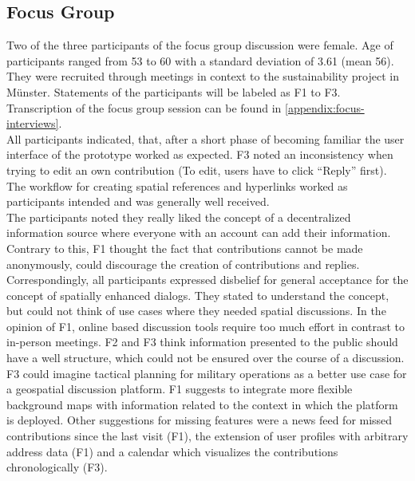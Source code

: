 \subsection{Focus Group}
\label{sub:ev_focus}
Two of the three participants of the focus group discussion were female. Age of participants ranged from 53 to 60 with a standard deviation of 3.61 (mean 56). They were recruited through meetings in context to the sustainability project in Münster. Statements of the participants will be labeled as F1 to F3. Transcription of the focus group session can be found in \ref{appendix:focus-interviews}.\\
All participants indicated, that, after a short phase of becoming familiar the user interface of the prototype worked as expected. F3 noted an inconsistency when trying to edit an own contribution (To edit, users have to click ``Reply'' first). The workflow for creating spatial references and hyperlinks worked as participants intended and was generally well received.\\
The participants noted they really liked the concept of a decentralized information source where everyone with an account can add their information. Contrary to this, F1 thought the fact that contributions cannot be made anonymously, could discourage the creation of contributions and replies.\\
Correspondingly, all participants expressed disbelief for general acceptance for the concept of spatially enhanced dialogs. They stated to understand the concept, but could not think of use cases where they needed spatial discussions. In the opinion of F1, online based discussion tools require too much effort in contrast to in-person meetings. F2 and F3 think information presented to the public should have a well structure, which could not be ensured over the course of a discussion. F3 could imagine tactical planning for military operations as a better use case for a geospatial discussion platform. F1 suggests to integrate more flexible background maps with information related to the context in which the platform is deployed. Other suggestions for missing features were a news feed for missed contributions since the last visit (F1), the extension of user profiles with arbitrary address data (F1) and a calendar which visualizes the contributions chronologically (F3).
